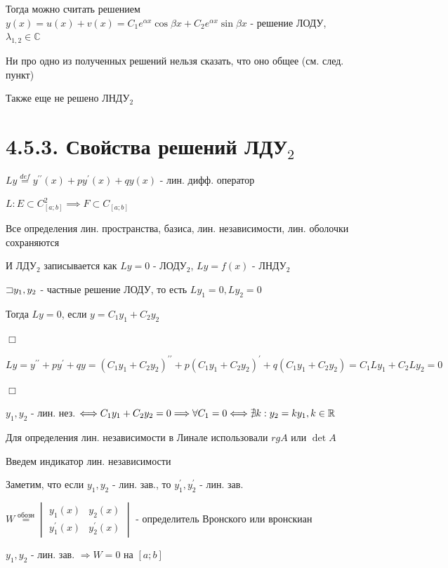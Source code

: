 \documentclass[12pt]{article}
\begin{document}
    Тогда можно считать решением $y(x) = u(x) + v(x) = C_1 e^{\alpha x}\cos\beta x + C_2 e^{\alpha x} \sin\beta x$ - решение ЛОДУ, $\lambda_{1,2} \in \mathbb{C}$

    \Nota Ни про одно из полученных решений нельзя сказать, что оно общее (см. след. пункт)

    Также еще не решено ЛНДУ$_2$

    \section{4.5.3. Свойства решений ЛДУ$_2$}

    \Def $Ly \stackrel{def}{=} y^{\prime\prime}(x) + py^\prime(x) + qy(x)$ - лин. дифф. оператор

    $L : E \subset C^2_{[a;b]} \implies F \subset C_{[a;b]}$

    \Nota Все определения лин. пространства, базиса, лин. независимости, лин. оболочки сохраняются

    И ЛДУ$_2$ записывается как $Ly = 0$ - ЛОДУ$_2$, $Ly = f(x)$ - ЛНДУ$_2$

     $\mathord{\sqsupset} y_1, y_2$ - частные решение ЛОДУ, то есть $Ly_1 = 0, Ly_2 = 0$

    Тогда $Ly = 0$, если $y = C_1 y_1 + C_2 y_2$

    $\Box$

    $Ly = y^{\prime\prime} + py^\prime + qy = (C_1 y_1 + C_2 y_2)^{\prime\prime} + p(C_1 y_1 + C_2 y_2)^{\prime} + q(C_1 y_1 + C_2 y_2) = C_1 Ly_1 + C_2 L y_2 = 0$

    $\Box$

    \Def $y_1, y_2$ - лин. нез. $\Longleftrightarrow C_1 y_1 + C_2 y_2 = 0 \Longrightarrow \forall C_1 = 0 \Longleftrightarrow \nexists k : y_2 = k y_1, k \in \mathbb{R}$

    \Mem Для определения лин. независимости в Линале использовали $rg A$ или $\det A$

    Введем индикатор лин. независимости

    Заметим, что если $y_1, y_2$ - лин. зав., то $y_1^\prime, y_2^\prime$ - лин. зав.

    \Def $W \stackrel{\text{обозн}}{=} \begin{vmatrix}y_1(x) & y_2(x) \\ y_1^\prime(x) & y_2^\prime(x)\end{vmatrix}$ - определитель Вронского или вронскиан

     $y_1, y_2$ - лин. зав. $\Longrightarrow W = 0$ на $[a;b]$
\end{document}
